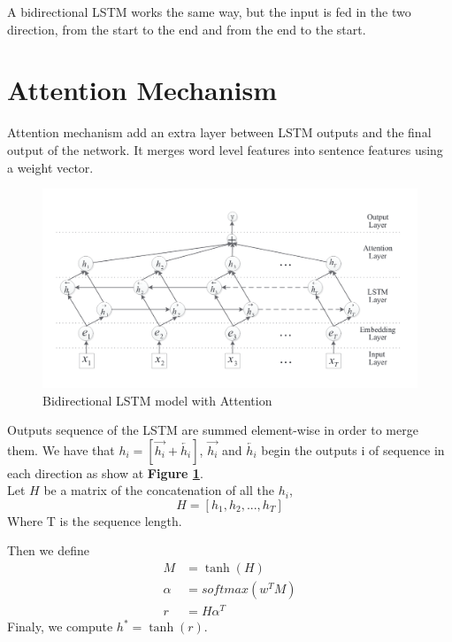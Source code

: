 A bidirectional LSTM works the same way, but the input is fed in the two direction, from the start to the end and from the end to the start.
\section{Attention Mechanism}
Attention mechanism\cite{zhou-etal-2016-attention,Vaswani2017AttentionIA} add an extra layer between LSTM outputs and the final output of the network. It merges word level features into sentence features using a weight vector. \\

\begin{figure}
	\centering
	\includegraphics[width=\textwidth]{images/chapitre4/attention.png}
	\caption{Bidirectional LSTM model with Attention}
	\label{fig:chap4:attention}
\end{figure}

Outputs sequence of the LSTM are summed element-wise in order to merge them. We have that $h_i = [\overrightarrow{h_i} + \overleftarrow{h_i}]$, $\overrightarrow{h_i}$ and $\overleftarrow{h_i}$ begin the outputs i of sequence in each direction as show at \textbf{Figure \ref{fig:chap4:attention}}.\\

Let $H$ be a matrix of the concatenation of all the $h_i$, 
\begin{equation}
	H = [h_1,h_2,...,h_T]
\end{equation}
Where T is the sequence length. 

Then we define 
\begin{align}
	M &= \tanh(H)\\
	\alpha &= softmax(w^TM) \\
	r &= H \alpha^T 
\end{align}
Finaly, we compute $h^* = \tanh(r)$.


